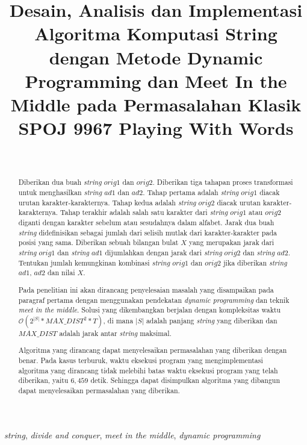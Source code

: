 \documentclass[a4paper]{IEEEtran}
\begin{document}
\title{Desain, Analisis dan Implementasi Algoritma Komputasi String dengan Metode Dynamic Programming dan Meet In the Middle pada Permasalahan Klasik SPOJ 9967 Playing With Words}
\author{\\
}
\maketitle

\begin{abstract}
	 Diberikan dua buah \textit{string} $orig1$ dan $orig2$. Diberikan tiga tahapan proses transformasi untuk menghasilkan \textit{string} $ad1$ dan $ad2$. Tahap pertama adalah \textit{string} $orig1$ diacak urutan karakter-karakternya. Tahap kedua adalah \textit{string} $orig2$ diacak urutan karakter-karakternya. Tahap terakhir adalah salah satu karakter dari \textit{string} $orig1$ atau $orig2$ diganti dengan karakter sebelum atau sesudahnya dalam alfabet. Jarak dua buah \textit{string} didefinisikan sebagai jumlah dari selisih mutlak dari karakter-karakter pada posisi yang sama. Diberikan sebuah bilangan bulat $X$ yang merupakan jarak dari \textit{string} $orig1$ dan \textit{string} $ad1$ dijumlahkan dengan jarak dari \textit{string} $orig2$ dan \textit{string} $ad2$. Tentukan jumlah kemungkinan kombinasi \textit{string} $orig1$ dan $orig2$ jika diberikan \textit{string} $ad1$, $ad2$ dan nilai $X$.	 
	 
	 Pada penelitian ini akan dirancang penyelesaian masalah yang disampaikan pada paragraf pertama dengan menggunakan pendekatan \textit{dynamic programming} dan teknik \textit{meet in the middle}. Solusi yang dikembangkan berjalan dengan kompleksitas waktu $\mathcal{O}(2^{|S|} * MAX\_DIST^{2} * T)$, di mana $|S|$ adalah panjang \textit{string} yang diberikan dan $MAX\_DIST$ adalah jarak antar \textit{string} maksimal.
	 
	 Algoritma yang dirancang dapat menyelesaikan permasalahan yang diberikan dengan benar. Pada kasus terburuk, waktu eksekusi program yang mengimplementasi algoritma yang dirancang tidak melebihi batas waktu eksekusi program yang telah diberikan, yaitu $ 6,459 $ detik. Sehingga dapat disimpulkan algoritma yang dibangun dapat menyelesaikan permasalahan yang diberikan.
\end{abstract}
\begin{IEEEkeywords}
	\textit{string}, \textit{divide and conquer}, \textit{meet in the middle}, \textit{dynamic programming}
\end{IEEEkeywords}
\end{document}
